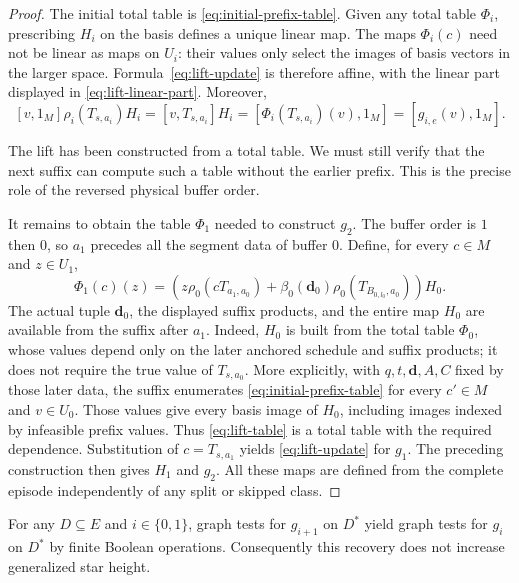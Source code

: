 \begin{proof}
The initial total table is \eqref{eq:initial-prefix-table}.
Given any total table $\Phi_i$, prescribing $H_i$ on the basis defines
a unique linear map.  The maps $\Phi_i(c)$ need not be linear as maps
on $U_i$: their values only select the images of basis vectors in the
larger space.  Formula~\eqref{eq:lift-update} is therefore affine, with
the linear part displayed in \eqref{eq:lift-linear-part}.  Moreover,
\[
 [v,1_M]\rho_i(T_{s,a_i})H_i
   =[v,T_{s,a_i}]H_i
   =[\Phi_i(T_{s,a_i})(v),1_M]
   =[g_{i,e}(v),1_M].
\]

The lift has been constructed from a total table. We must still verify
that the next suffix can compute such a table without the earlier prefix.
This is the precise role of the reversed physical buffer order.

It remains to obtain the table $\Phi_1$ needed to construct $g_2$.
The buffer order is $1$ then $0$, so $a_1$ precedes all the segment
data of buffer $0$.  Define, for every $c\in M$ and $z\in U_1$,
\begin{equation}
\label{eq:lift-table}
 \Phi_1(c)(z)=
 \left(z\rho_0(cT_{a_1,a_0})
       +\beta_0(\mathbf d_0)\rho_0(T_{B_{0,l_0},a_0})\right)H_0.
\end{equation}
The actual tuple $\mathbf d_0$, the displayed suffix products, and
the entire map $H_0$ are available from the suffix after $a_1$.
Indeed, $H_0$ is built from the total table $\Phi_0$, whose values
depend only on the later anchored schedule and suffix products; it
does not require the true value of $T_{s,a_0}$. More explicitly, with
$q,t,\mathbf d,A,C$ fixed by those later data, the suffix enumerates
\eqref{eq:initial-prefix-table} for every $c'\in M$ and $v\in U_0$.
Those values give every basis image of $H_0$, including images indexed by
infeasible prefix values. Thus
\eqref{eq:lift-table} is a total table with the required dependence.
Substitution of $c=T_{s,a_1}$ yields \eqref{eq:lift-update} for $g_1$.
The preceding construction then gives $H_1$ and $g_2$.
All these maps are defined from the complete episode independently
of any split or skipped class.
\end{proof}

\begin{lemma}
\label{lem:sequence-lift}
For any $D\subseteq E$ and $i\in\{0,1\}$, graph tests for $g_{i+1}$
on $D^*$ yield graph tests for $g_i$ on $D^*$ by finite Boolean
operations.  Consequently this recovery does not increase generalized
star height.
\end{lemma}

